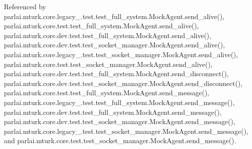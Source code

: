 Referenced by parlai.\+mturk.\+core.\+legacy\+\_.\+test.\+test\+\_\+full\+\_\+system.\+Mock\+Agent.\+send\+\_\+alive(), parlai.\+mturk.\+core.\+test.\+test\+\_\+full\+\_\+system.\+Mock\+Agent.\+send\+\_\+alive(), parlai.\+mturk.\+core.\+dev.\+test.\+test\+\_\+full\+\_\+system.\+Mock\+Agent.\+send\+\_\+alive(), parlai.\+mturk.\+core.\+dev.\+test.\+test\+\_\+socket\+\_\+manager.\+Mock\+Agent.\+send\+\_\+alive(), parlai.\+mturk.\+core.\+legacy\+\_.\+test.\+test\+\_\+socket\+\_\+manager.\+Mock\+Agent.\+send\+\_\+alive(), parlai.\+mturk.\+core.\+test.\+test\+\_\+socket\+\_\+manager.\+Mock\+Agent.\+send\+\_\+alive(), parlai.\+mturk.\+core.\+dev.\+test.\+test\+\_\+full\+\_\+system.\+Mock\+Agent.\+send\+\_\+disconnect(), parlai.\+mturk.\+core.\+dev.\+test.\+test\+\_\+socket\+\_\+manager.\+Mock\+Agent.\+send\+\_\+disconnect(), parlai.\+mturk.\+core.\+test.\+test\+\_\+full\+\_\+system.\+Mock\+Agent.\+send\+\_\+message(), parlai.\+mturk.\+core.\+legacy\+\_.\+test.\+test\+\_\+full\+\_\+system.\+Mock\+Agent.\+send\+\_\+message(), parlai.\+mturk.\+core.\+dev.\+test.\+test\+\_\+full\+\_\+system.\+Mock\+Agent.\+send\+\_\+message(), parlai.\+mturk.\+core.\+dev.\+test.\+test\+\_\+socket\+\_\+manager.\+Mock\+Agent.\+send\+\_\+message(), parlai.\+mturk.\+core.\+legacy\+\_.\+test.\+test\+\_\+socket\+\_\+manager.\+Mock\+Agent.\+send\+\_\+message(), and parlai.\+mturk.\+core.\+test.\+test\+\_\+socket\+\_\+manager.\+Mock\+Agent.\+send\+\_\+message().

